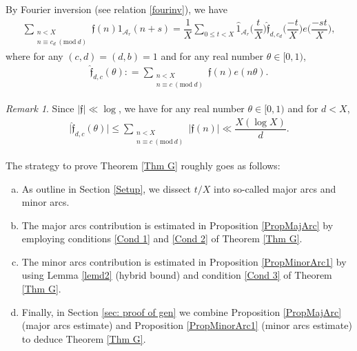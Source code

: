 \documentclass[12pt]{amsart}
\numberwithin{equation}{section}
\theoremstyle{remark}
\newtheorem*{remark}{Remark}
\theoremstyle{definition}
\newcommand{\imod}[1]{\ (\mathrm{mod}\ #1)}
\begin{document}
By Fourier inversion (see relation \eqref{fourinv}), we have
\begin{align}
\sum_{\substack{n < X\\n\equiv c_d \imod d}}\mathfrak{f}(n)1_{\mathcal{A}_r}(n+s) = \dfrac{1}{X}\sum_{0\leq t<X}\widehat{1}_{\mathcal{A}_r}\bigg(\dfrac{t}{X}\bigg)\widehat{\mathfrak{f}}_{d, c_d}\bigg(\dfrac{-t}{X}\bigg)e\bigg(\dfrac{-st}{X}\bigg),
\end{align}
where for any $(c, d)=(d, b)=1$ and for any real number $\theta\in [0, 1)$,
\begin{align}
\label{Fourf}\widehat{\mathfrak{f}}_{d, c}(\theta): = \sum_{\substack{n<X\\n\equiv c\imod d}}\mathfrak{f}(n)e(n\theta).
\end{align}

\begin{remark}
 Since $|\mathfrak{f}|\ll \log$, we have for any real number $\theta\in [0, 1)$ and for $d<X$, 
\begin{align}\label{Triv: for f}
\big|\widehat{\mathfrak{f}}_{d, c}(\theta)\big| \leq \sum_{\substack{n<X\\n\equiv c\imod d}}|\mathfrak{f}(n)| \ll \dfrac{X(\log X)}{d}.
\end{align}

\end{remark}



The strategy to prove Theorem \ref{Thm G} roughly goes as follows:
\begin{enumerate}[(a)]
\item As outline in Section \ref{Setup}, we dissect $t/X$ into so-called major arcs and minor arcs.
\item The major arcs contribution is estimated in Proposition \ref{PropMajArc} by employing conditions \ref{Cond 1} and \ref{Cond 2} of Theorem \ref{Thm G}.
\item The minor arcs contribution is estimated in Proposition \ref{PropMinorArc1} by using Lemma \ref{lemd2} (hybrid bound) and condition \ref{Cond 3} of Theorem \ref{Thm G}.
\item  Finally, in Section \ref{sec: proof of gen} we combine Proposition \ref{PropMajArc} (major arcs estimate) and Proposition \ref{PropMinorArc1} (minor arcs estimate) to deduce Theorem \ref{Thm G}.
\end{enumerate}
\end{document}
